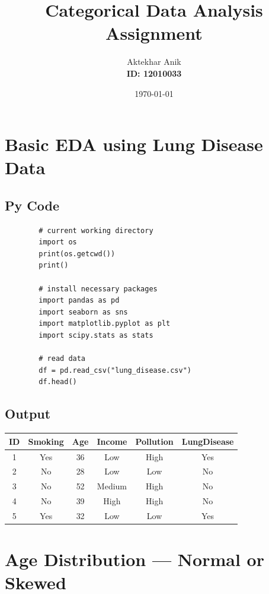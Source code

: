 \documentclass[a4paper,12pt]{article}
\begin{document}
	
	\title{Categorical Data Analysis Assignment}
	\author{Aktekhar Anik \\ \textbf{ID: 12010033}}
	\date{\today}
	\maketitle
	
	\tableofcontents
	\newpage

	
	\section{Basic EDA using Lung Disease Data}
	
	\subsection{Py Code}
	\begin{lstlisting}
		# current working directory
		import os
		print(os.getcwd())
		print()
		
		# install necessary packages
		import pandas as pd
		import seaborn as sns
		import matplotlib.pyplot as plt
		import scipy.stats as stats
		
		# read data
		df = pd.read_csv("lung_disease.csv")
		df.head()
	\end{lstlisting}
	
	\subsection{Output}
	\begin{center}
		\begin{tabular}{|c|c|c|c|c|c|}
			\hline
			\textbf{ID} & \textbf{Smoking} & \textbf{Age} & \textbf{Income} & \textbf{Pollution} & \textbf{LungDisease} \\
			\hline
			1 & Yes & 36 & Low & High & Yes \\
			2 & No & 28 & Low & Low & No \\
			3 & No & 52 & Medium & High & No \\
			4 & No & 39 & High & High & No \\
			5 & Yes & 32 & Low & Low & Yes \\
			\hline
		\end{tabular}
	\end{center}
\section{Age Distribution — Normal or Skewed}
\end{document}
